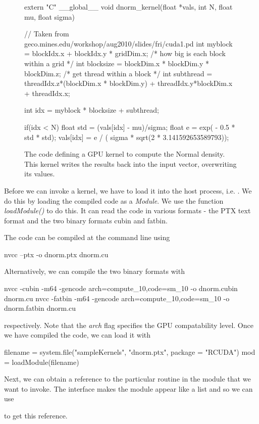 \documentclass[article]{jss}
\def\C{\proglang{C}}
\def\R{\proglang{R}}
\def\Rfunc#1{\textsl{#1()}}
\def\ShFlag#1{\textit{#1}}
\begin{document}
\begin{figure}
\begin{CCode}
extern "C"
__global__ void dnorm_kernel(float *vals, int N, float mu, float sigma)
{
       // Taken from geco.mines.edu/workshop/aug2010/slides/fri/cuda1.pd
    int myblock = blockIdx.x + blockIdx.y * gridDim.x;
           /* how big is each block within a grid */
    int blocksize = blockDim.x * blockDim.y * blockDim.z;
            /* get thread within a block */
    int subthread = threadIdx.z*(blockDim.x * blockDim.y) + 
                         threadIdx.y*blockDim.x + threadIdx.x;

    int idx = myblock * blocksize + subthread;

	if(idx < N) {
            float std = (vals[idx] - mu)/sigma;
	    float e = exp( - 0.5 * std * std);
	    vals[idx] = e / ( sigma * sqrt(2 * 3.141592653589793));
	}
}
\end{CCode}
\caption{The \C{} code defining a GPU kernel to compute the Normal
  density.  This kernel writes the results back into the input
  vector, overwriting its values.
}\label{fig:dnormKernelCode}
\end{figure}

Before we can invoke a kernel, we have to load it into the host
process, i.e. \R.  We do this by loading the compiled code as a
\textit{Module}.  We use the \R{} function \Rfunc{loadModule} to do
this. It can read the code in various formats - the PTX text format
and the two binary formats cubin and fatbin.

The code can be compiled at the command line using 
\begin{ShCode}
nvcc --ptx -o dnorm.ptx dnorm.cu
\end{ShCode}
Alternatively, we can compile the two binary formats with 
\begin{ShCode}
nvcc -cubin -m64 -gencode arch=compute_10,code=sm_10 -o dnorm.cubin dnorm.cu
nvcc -fatbin -m64 -gencode arch=compute_10,code=sm_10 -o dnorm.fatbin dnorm.cu
\end{ShCode}
respectively. Note that the \ShFlag{arch} flag specifies the GPU compatability level. %
Once we have compiled the code, we can load it with
\begin{RCode}
filename = system.file("sampleKernels", "dnorm.ptx", package = "RCUDA")
mod = loadModule(filename)
\end{RCode}
Next, we can obtain a reference to the particular routine in the
module  that we want to invoke.  The \R{} interface makes the module
appear like a list and so we can use
to get this reference.
\end{document}
